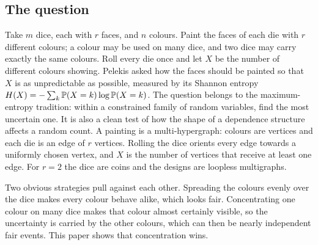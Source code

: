\documentclass[11pt,a4paper]{article}
\theoremstyle{definition}\newtheorem{remark}[theorem]{Remark}\newtheorem{conjecture}{Conjecture}
\begin{document}
\subsection{The question}
Take $m$ dice, each with $r$ faces, and $n$ colours. Paint the faces of each die with $r$ different colours; a colour may be used on many dice, and two dice may carry exactly the same colours. Roll every die once and let $X$ be the number of different colours showing. Pelekis \cite[Problem~1.2]{pelekis} asked how the faces should be painted so that $X$ is as unpredictable as possible, measured by its Shannon entropy $H(X)=-\sum_k\mathbb P(X=k)\log\mathbb P(X=k)$. The question belongs to the maximum-entropy tradition: within a constrained family of random variables, find the most uncertain one. It is also a clean test of how the shape of a dependence structure affects a random count. A painting is a multi-hypergraph: colours are vertices and each die is an edge of $r$ vertices. Rolling the dice orients every edge towards a uniformly chosen vertex, and $X$ is the number of vertices that receive at least one edge. For $r=2$ the dice are coins and the designs are loopless multigraphs.

Two obvious strategies pull against each other. Spreading the colours evenly over the dice makes every colour behave alike, which looks fair. Concentrating one colour on many dice makes that colour almost certainly visible, so the uncertainty is carried by the other colours, which can then be nearly independent fair events. This paper shows that concentration wins.
\end{document}
